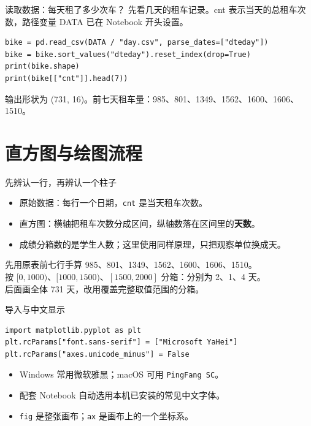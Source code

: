 \documentclass[9pt]{ctexbeamer}
\begin{document}
\begin{frame}[fragile]{读取数据：每天租了多少次车？}
\small 先看几天的租车记录。cnt 表示当天的总租车次数，路径变量 DATA 已在 Notebook 开头设置。\par\medskip
\begin{lstlisting}
bike = pd.read_csv(DATA / "day.csv", parse_dates=["dteday"])
bike = bike.sort_values("dteday").reset_index(drop=True)
print(bike.shape)
print(bike[["cnt"]].head(7))
\end{lstlisting}
\small 输出形状为 (731, 16)。前七天租车量：985、801、1349、1562、1600、1606、1510。
\end{frame}

\section{直方图与绘图流程}

\begin{frame}{先辨认一行，再辨认一个柱子}
\begin{itemize}
\item 原始数据：每行一个日期，\texttt{cnt} 是当天租车次数。
\item 直方图：横轴把租车次数分成区间，纵轴数落在区间里的\textbf{天数}。
\item 成绩分箱数的是学生人数；这里使用同样原理，只把观察单位换成天。
\end{itemize}
\begin{exampleblock}{先用原表前七行手算}
985、801、1349、1562、1600、1606、1510。\\
按 $[0,1000)$、$[1000,1500)$、$[1500,2000]$ 分箱：分别为 2、1、4 天。\\
后面画全体 731 天，改用覆盖完整取值范围的分箱。
\end{exampleblock}
\end{frame}

\begin{frame}[fragile]{导入与中文显示}
\begin{lstlisting}
import matplotlib.pyplot as plt
plt.rcParams["font.sans-serif"] = ["Microsoft YaHei"]
plt.rcParams["axes.unicode_minus"] = False
\end{lstlisting}
\begin{itemize}
\item Windows 常用微软雅黑；macOS 可用 \texttt{PingFang SC}。
\item 配套 Notebook 自动选用本机已安装的常见中文字体。
\item \texttt{fig} 是整张画布；\texttt{ax} 是画布上的一个坐标系。
\end{itemize}
\end{frame}
\end{document}
